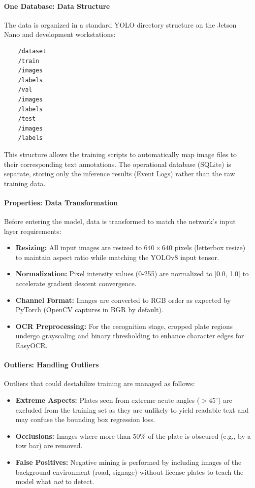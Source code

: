 \paragraph{One Database: Data Structure}
The data is organized in a standard YOLO directory structure on the Jetson Nano and development workstations:
\begin{verbatim}
	/dataset
	/train
	/images
	/labels
	/val
	/images
	/labels
	/test
	/images
	/labels
\end{verbatim}
This structure allows the training scripts to automatically map image files to their corresponding text annotations. The operational database (SQLite) is separate, storing only the inference results (Event Logs) rather than the raw training data.

\paragraph{Properties: Data Transformation}
Before entering the model, data is transformed to match the network's input layer requirements:
\begin{itemize}
	\item \textbf{Resizing:} All input images are resized to $640 \times 640$ pixels (letterbox resize) to maintain aspect ratio while matching the YOLOv8 input tensor.
	\item \textbf{Normalization:} Pixel intensity values (0-255) are normalized to [0.0, 1.0] to accelerate gradient descent convergence.
	\item \textbf{Channel Format:} Images are converted to RGB order as expected by PyTorch (OpenCV captures in BGR by default).
	\item \textbf{OCR Preprocessing:} For the recognition stage, cropped plate regions undergo grayscaling and binary thresholding to enhance character edges for EasyOCR.
\end{itemize}

\paragraph{Outliers: Handling Outliers}
Outliers that could destabilize training are managed as follows:
\begin{itemize}
	\item \textbf{Extreme Aspects:} Plates seen from extreme acute angles ($>45^\circ$) are excluded from the training set as they are unlikely to yield readable text and may confuse the bounding box regression loss.
	\item \textbf{Occlusions:} Images where more than 50\% of the plate is obscured (e.g., by a tow bar) are removed.
	\item \textbf{False Positives:} Negative mining is performed by including images of the background environment (road, signage) without license plates to teach the model what \textit{not} to detect.
\end{itemize}

